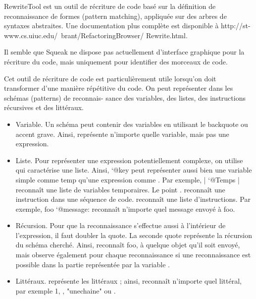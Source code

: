 \documentclass[a4paper,10pt,twoside]{book}
\begin{document}
RewriteTool est un outil de r\'ecriture de code bas\'e sur la d\'efinition
de reconnaissance de formes (pattern matching), appliqu\'ee sur des
arbres de syntaxes abstraites. Une documentation plus compl\`ete est
disponible à http://st-www.cs.uiuc.edu/~brant/RefactoringBrowser/
Rewrite.html.

Il semble que Squeak ne dispose pas actuellement d'interface graphique
pour la r\'ecriture du code, mais uniquement pour identifier des
morceaux de code.


Cet outil de r\'ecriture de code est particuli\`erement utile lorsqu'on
doit transformer d'une mani\`ere r\'ep\'etitive du code. On peut repr\'esenter
dans les sch\'emas (patterns) de reconnais- sance des variables, des
listes, des instructions r\'ecursives et des litt\'eraux.

\begin{itemize}
\item	Variable. Un sch\'ema peut contenir des variables en utilisant
  le backquote ou accent grave. Ainsi,  repr\'esente n'importe
  quelle variable, mais pas une expression.

\item Liste. Pour repr\'esenter une expression potentiellement
  complexe, on utilise  qui caract\'erise une liste. Ainsi, `@key
  peut repr\'esenter aussi bien une variable simple comme temp qu'une
  expression comme . Par exemple, | `@Temps
  | reconnaît une liste de variables temporaires. Le point . reconnaît
  une instruction dans une s\'equence de code.
  reconnaît une liste d'instructions. Par exemple, foo `@message:
   reconnaît n'importe quel message envoy\'e à foo.


\item R\'ecursion. Pour que la reconnaissance s'effectue aussi à
  l'int\'erieur de l'expression, il faut doubler la quote. La seconde
  quote repr\'esente la r\'ecursion du sch\'ema cherch\'e. Ainsi,
   reconnaît foo, à quelque objet qu'il soit envoy\'e,
  mais observe \'egalement pour chaque reconnaissance si une
  reconnaissance est possible dans la partie repr\'esent\'ee par la
  variable .

\item	Litt\'eraux. \ct{\#} repr\'esente les litt\'eraux ; ainsi, 
  reconnaît n'importe quel litt\'eral, par exemple 1, \ct{\#()}, "unechaine"
  ou .
\end{itemize}
\end{document}
